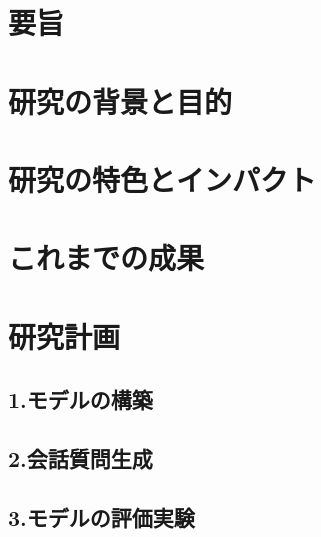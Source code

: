 \documentclass[a4paper,12pt]{jsarticle}
\begin{document}
\section*{要旨}

\section*{研究の背景と目的}

\section*{研究の特色とインパクト}

\section*{これまでの成果}

\section*{研究計画}

\subsection*{1.モデルの構築}

\subsection*{2.会話質問生成}

\subsection*{3.モデルの評価実験}
\end{document}
